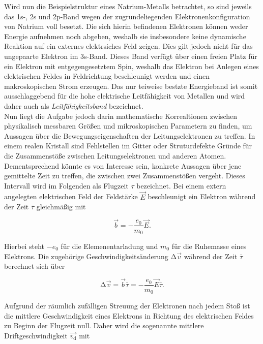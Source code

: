 \noindent Wird nun die Beispielstruktur eines Natrium-Metalls betrachtet, so sind jeweils das 1s-, 2s und 2p-Band wegen der 
zugrundeliegenden Elektronenkonfiguration von Natrium voll besetzt. Die sich hierin befindenen Elektronen können weder 
Energie aufnehmen noch abgeben, weshalb sie insbesondere keine dynamische Reaktion auf ein externes elektrsiches Feld zeigen.
Dies gilt jedoch nicht für das ungepaarte Elektron im 3s-Band. Dieses Band verfügt über einen freien Platz für ein Elektron 
mit entgegengesetztem Spin, weshalb das Elektron bei Anlegen eines elektrischen Feldes in Feldrichtung beschleunigt werden 
und einen makroskopischen Strom erzeugen. Das nur teiweise bestzte Energieband ist somit ausschlaggebend für die hohe 
elektrische Leitfähigkeit von Metallen und wird daher auch als \emph{Leitfähigkeitsband} bezeichnet.\\

\noindent Nun liegt die Aufgabe jedoch darin mathematische Korrealtionen zwischen physikalisch messbaren Größen und mikroskopischen 
Parametern zu finden, um Aussagen über die Bewegungseigenschaften der Leitungselektronen zu treffen. In einem realen Kristall 
sind Fehlstellen im Gitter oder Struturdefekte Gründe für die Zusammenstöße zwischen Leitungselektronen und anderen Atomen.
Dementsprechend könnte es von Interesse sein, konkrete Aussagen über jene gemittelte Zeit zu treffen, die zwischen zwei 
Zusammenstößen vergeht. Dieses Intervall wird im Folgenden als Flugzeit $\tau$ bezeichnet. Bei einem extern angelegten elektrischen 
Feld der Feldstärke $\vec{E}$ beschleunigt ein Elektron während der Zeit $\bar{\tau}$ gleichmäßig mit 

\begin{equation*}
    \vec{b} = -\frac{e_0}{m_0}\vec{E}.
\end{equation*}

\noindent Hierbei steht $-e_0$ für die Elemenentarladung und $m_0$ für die Ruhemasse eines Elektrons. Die zugehörige
Geschwindigkeitsänderung $\increment{}\vec{v}$ während der Zeit $\bar{\tau}$ berechnet sich über 

\begin{equation}
\label{eqn:velocity}
    \increment{}\vec{v} = \vec{b}\bar{\tau} = -\frac{e_0}{m_0}\vec{E}\bar{\tau}.
\end{equation}

\noindent Aufgrund der räumlich zufälligen Streuung der Elektronen nach jedem Stoß ist die mittlere Geschwindigkeit 
eines Elektrons in Richtung des elektrischen Feldes zu Beginn der Flugzeit null. Daher wird die sogenannte mittlere 
Driftgeschwindigkeit $\vec{v_\text{d}}$ mit 


